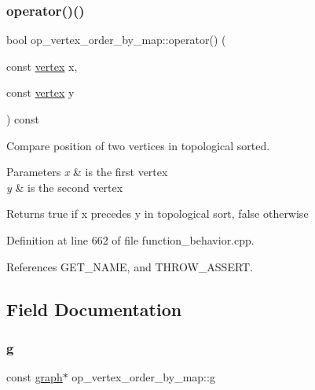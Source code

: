 \subsubsection{\texorpdfstring{operator()()}{operator()()}}
{\footnotesize\ttfamily bool op\+\_\+vertex\+\_\+order\+\_\+by\+\_\+map\+::operator() (\begin{DoxyParamCaption}\item[{const \hyperlink{graph_8hpp_abefdcf0544e601805af44eca032cca14}{vertex}}]{x,  }\item[{const \hyperlink{graph_8hpp_abefdcf0544e601805af44eca032cca14}{vertex}}]{y }\end{DoxyParamCaption}) const}



Compare position of two vertices in topological sorted. 


\begin{DoxyParams}{Parameters}
{\em x} & is the first vertex \\
\hline
{\em y} & is the second vertex \\
\hline
\end{DoxyParams}
\begin{DoxyReturn}{Returns}
true if x precedes y in topological sort, false otherwise 
\end{DoxyReturn}


Definition at line 662 of file function\+\_\+behavior.\+cpp.



References G\+E\+T\+\_\+\+N\+A\+ME, and T\+H\+R\+O\+W\+\_\+\+A\+S\+S\+E\+RT.



\subsection{Field Documentation}
\mbox{\label{classop__vertex__order__by__map_a96d9ff362e3189fef4206975913f55d9}} 
\subsubsection{\texorpdfstring{g}{g}}
{\footnotesize\ttfamily const \hyperlink{structgraph}{graph}$\ast$ op\+\_\+vertex\+\_\+order\+\_\+by\+\_\+map\+::g\hspace{0.3cm}{\ttfamily [private]}}



